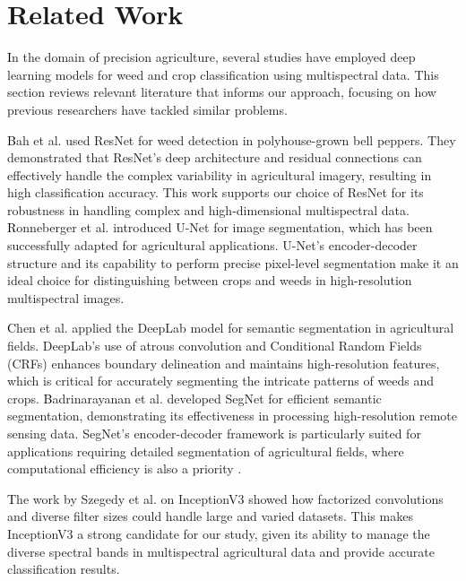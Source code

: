 \section{Related Work}
\vspace{-1mm}
\label{sec:Related work}
\textcolor{black}
In the domain of precision agriculture, several studies have employed deep learning models for weed and crop classification using multispectral data. This section reviews relevant literature that informs our approach, focusing on how previous researchers have tackled similar problems.

\textcolor{black}Bah et al.  \cite{bah2018deep} used ResNet for weed detection in polyhouse-grown bell peppers. They demonstrated that ResNet's deep architecture and residual connections can effectively handle the complex variability in agricultural imagery, resulting in high classification accuracy. This work supports our choice of ResNet for its robustness in handling complex and high-dimensional multispectral data. \textcolor{black}Ronneberger et al. \cite{ronneberger2015unet} introduced U-Net for image segmentation, which has been successfully adapted for agricultural applications\cite{mendoza2022cnn}. U-Net's encoder-decoder structure and its capability to perform precise pixel-level segmentation make it an ideal choice for distinguishing between crops and weeds in high-resolution multispectral images.

\textcolor{black}Chen et al.  \cite{chen2018deeplab} applied the DeepLab model for semantic segmentation in agricultural fields. DeepLab's use of atrous convolution and Conditional Random Fields (CRFs) enhances boundary delineation and maintains high-resolution features\cite{chen2018deeplab}, which is critical for accurately segmenting the intricate patterns of weeds and crops. \textcolor{black}Badrinarayanan et al. \cite{badrinarayanan2017segnet} developed SegNet for efficient semantic segmentation, demonstrating its effectiveness in processing high-resolution remote sensing data. SegNet’s encoder-decoder framework is particularly suited for applications requiring detailed segmentation of agricultural fields, where computational efficiency is also a priority .

\textcolor{black}The work by Szegedy et al. \cite{szegedy2016rethinking} on InceptionV3 showed how factorized convolutions and diverse filter sizes could handle large and varied datasets. This makes InceptionV3 a strong candidate for our study, given its ability to manage the diverse spectral bands in multispectral agricultural data and provide accurate classification results.

